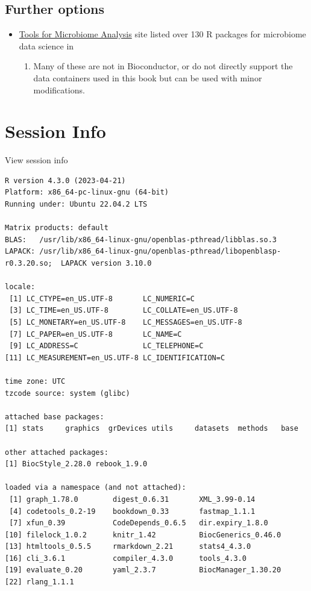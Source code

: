 \documentclass[
]{book}
\providecommand{\tightlist}{%
  \setlength{\itemsep}{0pt}\setlength{\parskip}{0pt}}
\begin{document}
\hypertarget{further-options}{%
\subsection{Further options}\label{further-options}}

\begin{itemize}
\tightlist
\item
  \href{https://microsud.github.io/Tools-Microbiome-Analysis/}{Tools for Microbiome
  Analysis}
  site listed over 130 R packages for microbiome data science in

  \begin{enumerate}
  \def\labelenumi{\arabic{enumi}.}
  \setcounter{enumi}{2022}
  \tightlist
  \item
    Many of these are not in Bioconductor, or do not directly
    support the data containers used in this book but can be used with
    minor modifications.
  \end{enumerate}
\end{itemize}

\hypertarget{session-info}{%
\section*{Session Info}\label{session-info}}

View session info

\begin{verbatim}
R version 4.3.0 (2023-04-21)
Platform: x86_64-pc-linux-gnu (64-bit)
Running under: Ubuntu 22.04.2 LTS

Matrix products: default
BLAS:   /usr/lib/x86_64-linux-gnu/openblas-pthread/libblas.so.3 
LAPACK: /usr/lib/x86_64-linux-gnu/openblas-pthread/libopenblasp-r0.3.20.so;  LAPACK version 3.10.0

locale:
 [1] LC_CTYPE=en_US.UTF-8       LC_NUMERIC=C              
 [3] LC_TIME=en_US.UTF-8        LC_COLLATE=en_US.UTF-8    
 [5] LC_MONETARY=en_US.UTF-8    LC_MESSAGES=en_US.UTF-8   
 [7] LC_PAPER=en_US.UTF-8       LC_NAME=C                 
 [9] LC_ADDRESS=C               LC_TELEPHONE=C            
[11] LC_MEASUREMENT=en_US.UTF-8 LC_IDENTIFICATION=C       

time zone: UTC
tzcode source: system (glibc)

attached base packages:
[1] stats     graphics  grDevices utils     datasets  methods   base     

other attached packages:
[1] BiocStyle_2.28.0 rebook_1.9.0    

loaded via a namespace (and not attached):
 [1] graph_1.78.0        digest_0.6.31       XML_3.99-0.14      
 [4] codetools_0.2-19    bookdown_0.33       fastmap_1.1.1      
 [7] xfun_0.39           CodeDepends_0.6.5   dir.expiry_1.8.0   
[10] filelock_1.0.2      knitr_1.42          BiocGenerics_0.46.0
[13] htmltools_0.5.5     rmarkdown_2.21      stats4_4.3.0       
[16] cli_3.6.1           compiler_4.3.0      tools_4.3.0        
[19] evaluate_0.20       yaml_2.3.7          BiocManager_1.30.20
[22] rlang_1.1.1        
\end{verbatim}
\end{document}
